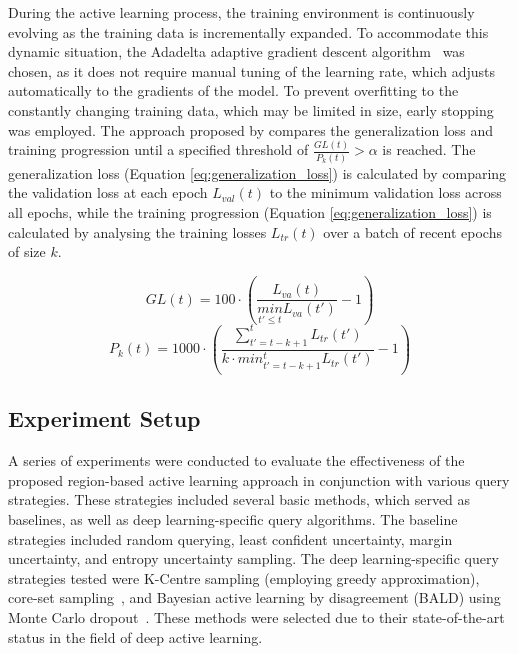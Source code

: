 During the active learning process, the training environment is continuously evolving as the training data is incrementally expanded. To accommodate this dynamic situation, the Adadelta adaptive gradient descent algorithm~\citep{zeiler2012adadelta} was chosen, as it does not require manual tuning of the learning rate, which adjusts automatically to the gradients of the model. To prevent overfitting to the constantly changing training data, which may be limited in size, early stopping was employed. The approach proposed by \cite{prechelt1998early} compares the generalization loss and training progression until a specified threshold of $\frac{GL(t)}{P_k(t)} > \alpha$ is reached. The generalization loss (Equation \ref{eq:generalization_loss}) is calculated by comparing the validation loss at each epoch $L_{val}(t)$ to the minimum validation loss across all epochs, while the training progression (Equation \ref{eq:generalization_loss}) is calculated by analysing the training losses $L_{tr}(t)$ over a batch of recent epochs of size $k$.

\begin{equation}
	GL(t) = 100 \cdot \left ( \frac{L_{va}(t)}{\underset{t'\leq t}{min}L_{va}(t')} - 1 \right )
	\label{eq:generalization_loss}
\end{equation}
\begin{equation}
	P_k(t) = 1000 \cdot \left ( \frac{\sum_{t'=t-k+1}^{t}L_{tr}(t')}{k \cdot min^{t}_{t'=t-k+1}L_{tr}(t')} - 1\right )
	\label{eq:training_progression}
\end{equation}

\subsection{Experiment Setup}
\label{subsec:active_experiments}
A series of experiments were conducted to evaluate the effectiveness of the proposed region-based active learning approach in conjunction with various query strategies. These strategies included several basic methods, which served as baselines, as well as deep learning-specific query algorithms. The baseline strategies included random querying, least confident uncertainty, margin uncertainty, and entropy uncertainty sampling. The deep learning-specific query strategies tested were K-Centre sampling (employing greedy approximation), core-set sampling~\citep{sener2017active}, and Bayesian active learning by disagreement (BALD) using Monte Carlo dropout~\citep{gal2017deep}. These methods were selected due to their state-of-the-art status in the field of deep active learning. 

